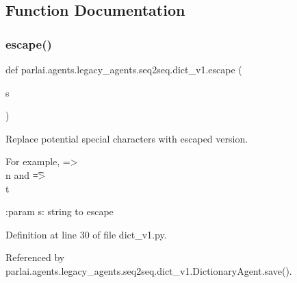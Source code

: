 \subsection{Function Documentation}
\mbox{\label{namespaceparlai_1_1agents_1_1legacy__agents_1_1seq2seq_1_1dict__v1_a780f6055b01f2cffa03c670159317ee0}} 
\subsubsection{\texorpdfstring{escape()}{escape()}}
{\footnotesize\ttfamily def parlai.\+agents.\+legacy\+\_\+agents.\+seq2seq.\+dict\+\_\+v1.\+escape (\begin{DoxyParamCaption}\item[{}]{s }\end{DoxyParamCaption})}

\begin{DoxyVerb}Replace potential special characters with escaped version.

For example, \n => \\n and \t => \\t

:param s: string to escape
\end{DoxyVerb}
 

Definition at line 30 of file dict\+\_\+v1.\+py.



Referenced by parlai.\+agents.\+legacy\+\_\+agents.\+seq2seq.\+dict\+\_\+v1.\+Dictionary\+Agent.\+save().

